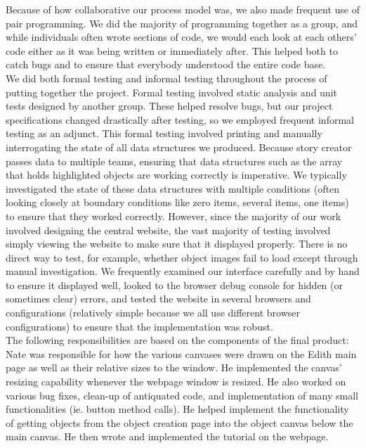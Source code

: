 \documentclass[12pt]{article}
\begin{document}
Because of how collaborative our process model was, we also made frequent use of pair programming. We did the majority of programming together as a group, and while individuals often wrote sections of code, we would each look at each others’ code either as it was being written or immediately after. This helped both to catch bugs and to ensure that everybody understood the entire code base. \\

We did both formal testing and informal testing throughout the process of putting together the project. Formal testing involved static analysis and unit tests designed by another group. These helped resolve bugs, but our project specifications changed drastically after testing, so we employed frequent informal testing as an adjunct. This formal testing involved printing and manually interrogating the state of all data structures we produced. Because story creator passes data to multiple teams, ensuring that data structures such as the array that holds highlighted objects are working correctly is imperative. We typically investigated the state of these data structures with multiple conditions (often looking closely at boundary conditions like zero items, several items, one items) to ensure that they worked correctly. However, since the majority of our work involved designing the central website, the vast majority of testing involved simply viewing the website to make sure that it displayed properly. There is no direct way to test, for example, whether object images fail to load except through manual investigation. We frequently examined our interface carefully and by hand to ensure it displayed well, looked to the browser debug console for hidden (or sometimes clear) errors, and tested the website in several browsers and configurations (relatively simple because we all use different browser configurations) to ensure that the implementation was robust. \\



The following responsibilities are based on the components of the final product: \\

Nate was responsible for how the various canvases were drawn on the Edith main page as well as their relative sizes to the window. He implemented the canvas' resizing capability whenever the webpage window is resized. He also worked on various bug fixes, clean-up of antiquated code, and implementation of many small functionalities (ie. button method calls). He helped implement the functionality of getting objects from the object creation page into the object canvas below the main canvas. He then wrote and implemented the tutorial on the webpage. \\
\end{document}
